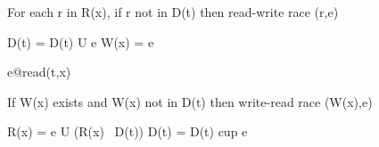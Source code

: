 \documentclass[landscape, a4paper]{article}
\begin{document}
\begin{minipage}[t]{0.19\linewidth}
\begin{betterlist}
{\begin{dnumberedcodebox}[minted language=text,minted options={autogobble, fontsize=\Large}, box align=top]
{                    For each r in R(x),
                    if r not in D(t)
                    then read-write race  (r,e)

                    D(t) = D(t) U { e }
                    W(x) = e
                  }
                  e@read(t,x) {
                    If W(x) exists and W(x) not in D(t)
                    then write-read race (W(x),e)

                    R(x) = {e} U (R(x) \ D(t))
                    D(t) = D(t) cup { e }
                  }
                  \end{dnumberedcodebox}
		}
	\end{betterlist}
\end{minipage}
\begin{minipage}[t]{0.19\linewidth}
	\raggedright


\end{minipage}
\end{document}
